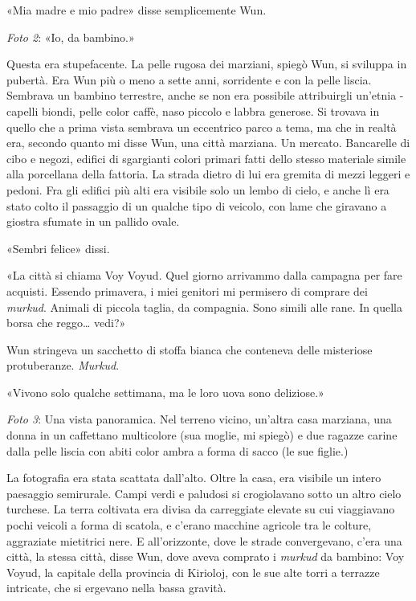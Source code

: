 «Mia madre e mio padre» disse semplicemente Wun.

\emph{Foto 2}: «Io, da bambino.»

Questa era stupefacente. La pelle rugosa dei marziani, spiegò Wun, si
sviluppa in pubertà. Era Wun più o meno a sette anni, sorridente e con
la pelle liscia. Sembrava un bambino terrestre, anche se non era
possibile attribuirgli un'etnia - capelli biondi, pelle color caffè,
naso piccolo e labbra generose. Si trovava in quello che a prima vista
sembrava un eccentrico parco a tema, ma che in realtà era, secondo
quanto mi disse Wun, una città marziana. Un mercato. Bancarelle di cibo
e negozi, edifici di sgargianti colori primari fatti dello stesso
materiale simile alla porcellana della fattoria. La strada dietro di lui
era gremita di mezzi leggeri e pedoni. Fra gli edifici più alti era
visibile solo un lembo di cielo, e anche lì era stato colto il passaggio
di un qualche tipo di veicolo, con lame che giravano a giostra sfumate
in un pallido ovale.

«Sembri felice» dissi.

«La città si chiama Voy Voyud. Quel giorno arrivammo dalla campagna per
fare acquisti. Essendo primavera, i miei genitori mi permisero di
comprare dei \emph{murkud}. Animali di piccola taglia, da compagnia.
Sono simili alle rane. In quella borsa che reggo\ldots{} vedi?»

Wun stringeva un sacchetto di stoffa bianca che conteneva delle
misteriose protuberanze. \emph{Murkud}.

«Vivono solo qualche settimana, ma le loro uova sono deliziose.»

\emph{Foto 3}: Una vista panoramica. Nel terreno vicino, un'altra casa
marziana, una donna in un caffettano multicolore (sua moglie, mi spiegò)
e due ragazze carine dalla pelle liscia con abiti color ambra a forma di
sacco (le sue figlie.)

La fotografia era stata scattata dall'alto. Oltre la casa, era visibile
un intero paesaggio semirurale. Campi verdi e paludosi si crogiolavano
sotto un altro cielo turchese. La terra coltivata era divisa da
carreggiate elevate su cui viaggiavano pochi veicoli a forma di scatola,
e c'erano macchine agricole tra le colture, aggraziate mietitrici nere.
E all'orizzonte, dove le strade convergevano, c'era una città, la stessa
città, disse Wun, dove aveva comprato i \emph{murkud} da bambino: Voy
Voyud, la capitale della provincia di Kirioloj, con le sue alte torri a
terrazze intricate, che si ergevano nella bassa gravità.

